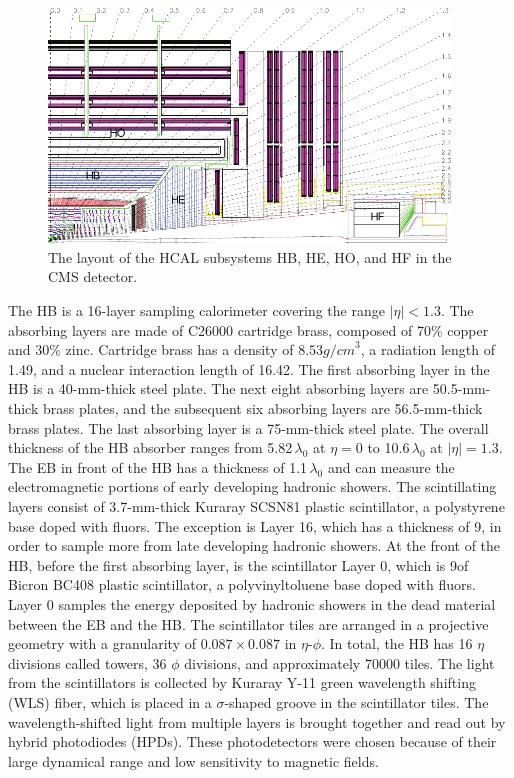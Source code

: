 \documentclass[12pt]{thesis}  %
\begin{document}
\begin{figure}[hbt]
\begin{center}
\includegraphics[width=0.95\textwidth]{figures/HCAL_subdet.pdf}
\caption{The layout of the HCAL subsystems HB, HE, HO, and HF in the CMS detector.}
\label{fig:hcal-layout}
\end{center}
\end{figure}

The HB is a 16-layer sampling calorimeter covering the range $|\eta|<1.3$. The absorbing layers are made of C26000 cartridge brass, composed of 70\% copper and 30\% zinc. Cartridge brass has a density of $8.53\unit{g/cm}^3$, a radiation length of 1.49\cm, and a nuclear interaction length of 16.42\cm. The first absorbing layer in the HB is a 40-mm-thick steel plate. The next eight absorbing layers are 50.5-mm-thick brass plates, and the subsequent six absorbing layers are 56.5-mm-thick brass plates. The last absorbing layer is a 75-mm-thick steel plate. The overall thickness of the HB absorber ranges from 5.82$\,\lambda_{0}$ at $\eta=0$ to 10.6$\,\lambda_{0}$ at $|\eta|=1.3$. The EB in front of the HB has a thickness of 1.1$\,\lambda_{0}$ and can measure the electromagnetic portions of early developing hadronic showers. The scintillating layers consist of 3.7-mm-thick Kuraray SCSN81 plastic scintillator, a polystyrene base doped with fluors. The exception is Layer 16, which has a thickness of 9\mm, in order to sample more from late developing hadronic showers. At the front of the HB, before the first absorbing layer, is the scintillator Layer 0, which is 9\mm of Bicron BC408 plastic scintillator, a polyvinyltoluene base doped with fluors. Layer 0 samples the energy deposited by hadronic showers in the dead material between the EB and the HB. The scintillator tiles are arranged in a projective geometry with a granularity of $0.087\times0.087$ in $\eta$-$\phi$. In total, the HB has 16 $\eta$ divisions called towers, 36 $\phi$ divisions, and approximately 70000 tiles. The light from the scintillators is collected by Kuraray Y-11 green wavelength shifting (WLS) fiber, which is placed in a $\sigma$-shaped groove in the scintillator tiles. The wavelength-shifted light from multiple layers is brought together and read out by hybrid photodiodes (HPDs). These photodetectors were chosen because of their large dynamical range and low sensitivity to magnetic fields.
\end{document}
